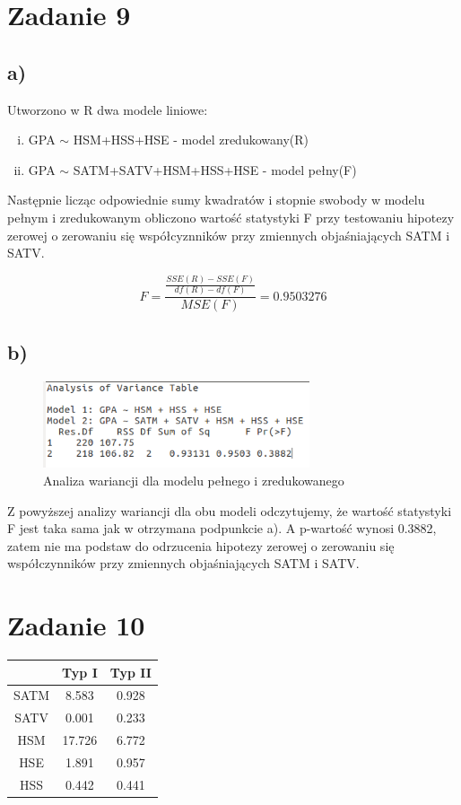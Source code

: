 \documentclass[9pt]{article}  %
\begin{document}
\section{Zadanie 9}
\subsection{a)}

Utworzono w R dwa modele liniowe:
\begin{enumerate}[i)]
\item GPA $\sim$ HSM+HSS+HSE - model zredukowany(R)
\item GPA $\sim$ SATM+SATV+HSM+HSS+HSE - model pełny(F)
\end{enumerate}

Następnie licząc odpowiednie sumy kwadratów i stopnie swobody w modelu pełnym i zredukowanym obliczono wartość statystyki F przy testowaniu hipotezy zerowej o zerowaniu się współcyznników przy zmiennych objaśniających SATM i SATV.

$$ F = \frac{ \frac{SSE(R) - SSE(F)}{df(R) - df(F) } }{MSE(F) }  = 0.9503276$$
\subsection{b)}

    \begin{figure}[H]
      \centering
      \includegraphics[width=0.7\textwidth]{9b.png}
      \caption {Analiza wariancji dla modelu pełnego i zredukowanego}
    \end{figure} 

  Z powyższej analizy wariancji dla obu modeli odczytujemy, że wartość statystyki F jest taka sama jak w otrzymana podpunkcie a). A p-wartość wynosi 0.3882, zatem nie ma podstaw do odrzucenia hipotezy zerowej o zerowaniu się współczynników przy zmiennych objaśniających SATM i SATV.

\section{Zadanie 10}

  \begin{table}[H]
  \centering
    \begin{tabular}{c|c|c}
     & Typ I & Typ II  \\ \hline
     SATM & 8.583 & 0.928  \\ \hline
     SATV & 0.001 & 0.233   \\ \hline
     HSM & 17.726  & 6.772 \\ \hline
     HSE & 1.891  &  0.957  \\ \hline
     HSS & 0.442 &  0.441  \\ 
  \end{tabular} 
  \end{table}
\end{document}
